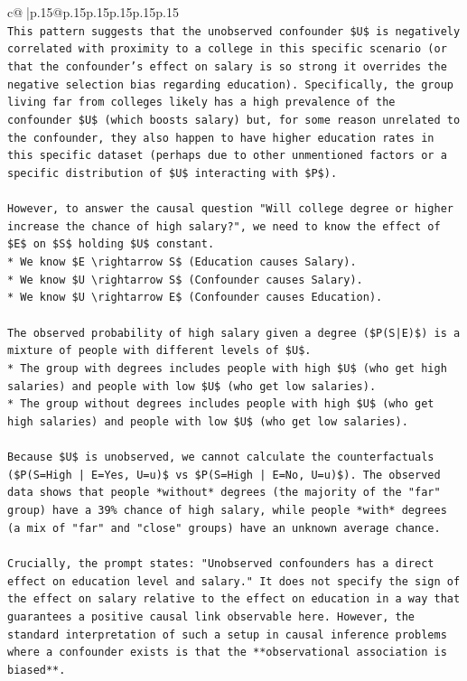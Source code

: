 \documentclass{article}
\begin{document}
{\begin{supertabular}{c@{$\;$}|p{.15\linewidth}@{}p{.15\linewidth}p{.15\linewidth}p{.15\linewidth}p{.15\linewidth}p{.15\linewidth}}
{{{\\ 
\texttt{This pattern suggests that the unobserved confounder \$U\$ is negatively correlated with proximity to a college in this specific scenario (or that the confounder's effect on salary is so strong it overrides the negative selection bias regarding education). Specifically, the group living far from colleges likely has a high prevalence of the confounder \$U\$ (which boosts salary) but, for some reason unrelated to the confounder, they also happen to have higher education rates in this specific dataset (perhaps due to other unmentioned factors or a specific distribution of \$U\$ interacting with \$P\$).} \\
\\ 
\texttt{However, to answer the causal question "Will college degree or higher increase the chance of high salary?", we need to know the effect of \$E\$ on \$S\$ holding \$U\$ constant.} \\
\texttt{*   We know \$E \textbackslash{}rightarrow S\$ (Education causes Salary).} \\
\texttt{*   We know \$U \textbackslash{}rightarrow S\$ (Confounder causes Salary).} \\
\texttt{*   We know \$U \textbackslash{}rightarrow E\$ (Confounder causes Education).} \\
\\ 
\texttt{The observed probability of high salary given a degree (\$P(S|E)\$) is a mixture of people with different levels of \$U\$.} \\
\texttt{*   The group with degrees includes people with high \$U\$ (who get high salaries) and people with low \$U\$ (who get low salaries).} \\
\texttt{*   The group without degrees includes people with high \$U\$ (who get high salaries) and people with low \$U\$ (who get low salaries).} \\
\\ 
\texttt{Because \$U\$ is unobserved, we cannot calculate the counterfactuals (\$P(S=High | E=Yes, U=u)\$ vs \$P(S=High | E=No, U=u)\$). The observed data shows that people *without* degrees (the majority of the "far" group) have a 39\% chance of high salary, while people *with* degrees (a mix of "far" and "close" groups) have an unknown average chance.} \\
\\ 
\texttt{Crucially, the prompt states: "Unobserved confounders has a direct effect on education level and salary." It does not specify the sign of the effect on salary relative to the effect on education in a way that guarantees a positive causal link observable here. However, the standard interpretation of such a setup in causal inference problems where a confounder exists is that the **observational association is biased**.} \\
}}}
\end{supertabular}}
\end{document}
